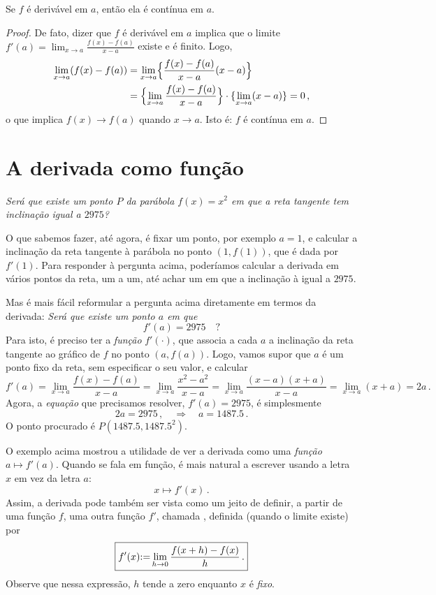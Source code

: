 \begin{teo}\label{Teo:derivimplicacontin}
 Se $f$ é derivável em $a$, então ela é contínua em $a$.
\end{teo}
\begin{proof}
 De fato, dizer que $f$ é derivável em $a$ implica que o limite $f'(a)=\lim_{x\to
a}\frac{f(x)-f(a)}{x-a}$ existe e é finito. Logo, 
\begin{align*}
\lim_{x\to a}(f(x)-f(a))&=
\lim_{x\to a}\Bigl\{\frac{f(x)-f(a)}{x-a}(x-a)
\Bigr\}\\
&=
\Bigl\{\lim_{x\to a}\frac{f(x)-f(a)}{x-a}
\Bigr\}\cdot \{\lim_{x\to a}(x-a)\}=0\,,
\end{align*}
o que implica $f(x)\to f(a)$ quando $x\to a$. Isto é: $f$ é contínua em $a$.
\end{proof}

\section{A derivada como função}

\begin{ex}
\emph{Será que existe um ponto $P$ da parábola $f(x)=x^2$ em que a
reta tangente tem inclinação igual a $2975$?}

O que sabemos fazer, até agora, é fixar um ponto, por exemplo $a=1$, e calcular a inclinação da reta
tangente à parábola no ponto $(1,f(1))$, que é dada por $f'(1)$.
Para responder à pergunta acima, poderíamos calcular a derivada em vários 
pontos da reta, um a um, até achar um
em que a inclinação à igual a $2975$.

Mas é mais fácil reformular a pergunta acima diretamente em termos da derivada: \emph{Será
que existe um ponto $a$ em que}
\[ f'(a)=2975\quad ?
\]
Para isto, é preciso ter a \emph{função} $f'(\cdot)$, que associa a cada $a$ a inclinação
da reta tangente ao gráfico de $f$ no ponto $(a,f(a))$.
Logo, vamos supor que $a$ é um ponto fixo da reta, sem
especificar o seu valor, e calcular
\[ 
f'(a)
=\lim_{x\to a}\frac{f(x)-f(a)}{x-a}
=\lim_{x\to a}\frac{x^2-a^2}{x-a}
=\lim_{x\to a}\frac{(x-a)(x+a)}{x-a}
=\lim_{x\to a}(x+a)
=2a\,.
\]
Agora, a \emph{equação} que precisamos resolver, $f'(a)=2975$, é simplesmente
\[ 
2a=2975\,,\quad \Rightarrow \quad 
a=1487.5\,.
\]
O ponto procurado é $P(1487.5,1487.5^2)$.
\end{ex}

O exemplo acima mostrou a utilidade de ver a derivada como uma \emph{função}
$a\mapsto f'(a)$.
Quando se fala em função, é mais
natural a escrever usando a letra $x$ em
vez da letra $a$: $$x\mapsto f'(x)\,.$$
Assim, a derivada pode também ser vista como um jeito de definir, a partir de
uma função $f$, uma outra função $f'$, chamada ,
definida (quando o limite existe) por 
$$\boxed{f'(x){:=} \lim_{h\to 0}\frac{f(x+h)-f(x)}{h}\,.}$$
Observe que nessa expressão, $h$ tende a zero enquanto $x$ é \emph{fixo}.

